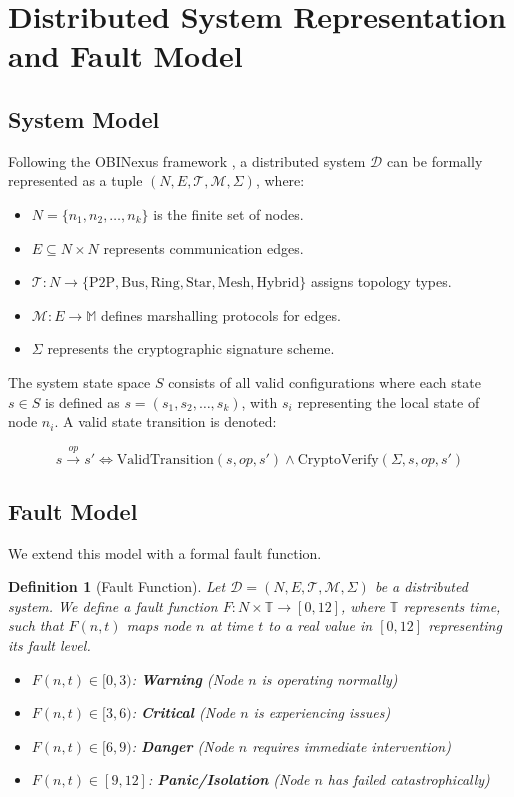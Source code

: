 \documentclass{article}
\newtheorem{definition}{Definition}
\begin{document}
\section{Distributed System Representation and Fault Model}

\subsection{System Model}

Following the OBINexus framework \cite{obinexus2025marshalling}, a distributed system $\mathcal{D}$ can be formally represented as a tuple $(N, E, \mathcal{T}, \mathcal{M}, \Sigma)$, where:

\begin{itemize}
\item $N = \{n_1, n_2, \ldots, n_k\}$ is the finite set of nodes.
\item $E \subseteq N \times N$ represents communication edges.
\item $\mathcal{T}: N \rightarrow \{\text{P2P}, \text{Bus}, \text{Ring}, \text{Star}, \text{Mesh}, \text{Hybrid}\}$ assigns topology types.
\item $\mathcal{M}: E \rightarrow \mathbb{M}$ defines marshalling protocols for edges.
\item $\Sigma$ represents the cryptographic signature scheme.
\end{itemize}

The system state space $S$ consists of all valid configurations where each state $s \in S$ is defined as $s = (s_1, s_2, \ldots, s_k)$, with $s_i$ representing the local state of node $n_i$. A valid state transition is denoted:

$$s \xrightarrow{op} s' \Leftrightarrow \text{ValidTransition}(s, op, s') \wedge \text{CryptoVerify}(\Sigma, s, op, s')$$

\subsection{Fault Model}

We extend this model with a formal fault function.

\begin{definition}[Fault Function]
Let $\mathcal{D} = (N, E, \mathcal{T}, \mathcal{M}, \Sigma)$ be a distributed system. We define a fault function $F: N \times \mathbb{T} \rightarrow [0, 12]$, where $\mathbb{T}$ represents time, such that $F(n, t)$ maps node $n$ at time $t$ to a real value in $[0, 12]$ representing its fault level.

\begin{itemize}
\item $F(n, t) \in [0, 3)$: \textbf{Warning} (Node $n$ is operating normally)
\item $F(n, t) \in [3, 6)$: \textbf{Critical} (Node $n$ is experiencing issues)
\item $F(n, t) \in [6, 9)$: \textbf{Danger} (Node $n$ requires immediate intervention)
\item $F(n, t) \in [9, 12]$: \textbf{Panic/Isolation} (Node $n$ has failed catastrophically)
\end{itemize}
\end{definition}
\end{document}

